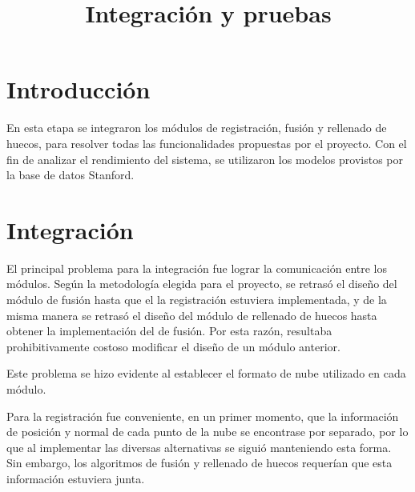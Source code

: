 \documentclass{pfc}
\title{Integración y pruebas}
\begin{document}
	\maketitle
	\section{Introducción}
	En esta etapa se integraron los módulos de registración, fusión y rellenado de huecos,
	para resolver todas las funcionalidades propuestas por el proyecto.
	Con el fin de analizar el rendimiento del sistema,
	se utilizaron los modelos provistos por la base de datos Stanford. %

	\section{Integración}
		El principal problema para la integración fue lograr la comunicación entre los módulos.
		Según la metodología %
		 elegida para el proyecto, se retrasó el diseño del
		módulo de fusión hasta que el la registración estuviera implementada, y
		de la misma manera se retrasó el diseño del módulo de rellenado de
		huecos hasta obtener la implementación del de fusión.
		Por esta razón, resultaba prohibitivamente costoso modificar el diseño de un módulo anterior.

		Este problema se hizo evidente al establecer el formato de nube utilizado en cada módulo.
		
        Para la registración fue conveniente, en un primer momento,
		que la información de posición y normal de cada punto de la nube se encontrase por separado,
		por lo que al implementar las diversas alternativas se siguió manteniendo esta forma.
		Sin embargo, los algoritmos de fusión y rellenado de huecos requerían
		que esta información estuviera junta.
\end{document}

